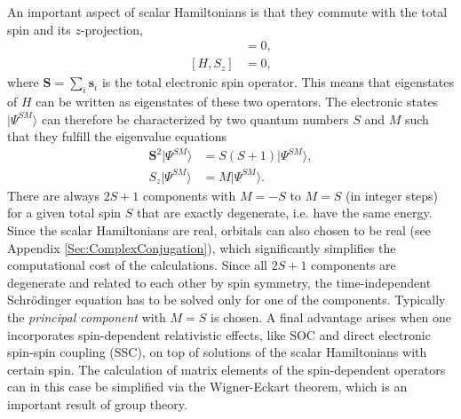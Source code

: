 An important aspect of scalar Hamiltonians is that they commute with the total spin and its $z$-projection,
\begin{align}
[H, \mathbf{S}^2] &= 0, \\
[H, S_z] &= 0,
\end{align}
where $\mathbf{S} = \sum_i \mathbf{s}_i$ is the total electronic spin operator. This means that eigenstates of $H$ can be written as eigenstates of these two operators. The electronic states $|\Psi^{SM}\rangle$ can therefore be characterized by two quantum numbers $S$ and $M$ such that they fulfill the eigenvalue equations
\begin{align}
\mathbf{S}^2 |\Psi^{SM}\rangle &= S(S+1)|\Psi^{SM}\rangle, \\
S_z |\Psi^{SM}\rangle &= M|\Psi^{SM}\rangle.
\end{align}
There are always $2S+1$ components with $M=-S$ to $M=S$ (in integer steps) for a given total spin $S$ that are exactly degenerate, i.e. have the same energy. Since the scalar Hamiltonians are real, orbitals can also chosen to be real (see Appendix \ref{Sec:ComplexConjugation}), which significantly simplifies the computational cost of the calculations. Since all $2S+1$ components are degenerate and related to each other by spin symmetry, the time-independent Schrödinger equation has to be solved only for one of the components. Typically the \emph{principal component} with $M=S$ is chosen. A final advantage arises when one incorporates spin-dependent relativistic effects, like SOC and direct electronic spin-spin coupling (SSC), on top of solutions of the scalar Hamiltonians with certain spin. The calculation of matrix elements of the spin-dependent operators can in this case be simplified via the Wigner-Eckart theorem,\cite{Wigne_1959_} which is an important result of group theory.

